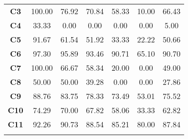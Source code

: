 \begin{appendices}
\begin{table}[h]
{\begin{tabular}{c|cccccc}
\rowcolor[HTML]{DAE8E5} 
{\color[HTML]{000000} \textbf{C3}} & {\color[HTML]{000000} 100.00} & {\color[HTML]{000000} 76.92} & {\color[HTML]{000000} 70.84} & {\color[HTML]{000000} 58.33} & {\color[HTML]{000000} 10.00} & {\color[HTML]{000000} 66.43} \\
\rowcolor[HTML]{EEF9FB} 
{\color[HTML]{000000} \textbf{C4}} & {\color[HTML]{000000} 33.33} & {\color[HTML]{000000} 0.00} & {\color[HTML]{000000} 0.00} & {\color[HTML]{000000} 0.00} & {\color[HTML]{000000} 0.00} & {\color[HTML]{000000} 5.00} \\
\rowcolor[HTML]{DAE8E5} 
{\color[HTML]{000000} \textbf{C5}} & {\color[HTML]{000000} 91.67} & {\color[HTML]{000000} 61.54} & {\color[HTML]{000000} 51.92} & {\color[HTML]{000000} 33.33} & {\color[HTML]{000000} 22.22} & {\color[HTML]{000000} 50.66} \\
\rowcolor[HTML]{EEF9FB} 
{\color[HTML]{000000} \textbf{C6}} & {\color[HTML]{000000} 97.30} & {\color[HTML]{000000} 95.89} & {\color[HTML]{000000} 93.46} & {\color[HTML]{000000} 90.71} & {\color[HTML]{000000} 65.10} & {\color[HTML]{000000} 90.70} \\
\rowcolor[HTML]{DAE8E5} 
{\color[HTML]{000000} \textbf{C7}} & {\color[HTML]{000000} 100.00} & {\color[HTML]{000000} 66.67} & {\color[HTML]{000000} 58.34} & {\color[HTML]{000000} 20.00} & {\color[HTML]{000000} 0.00} & {\color[HTML]{000000} 49.00} \\
\rowcolor[HTML]{EEF9FB} 
{\color[HTML]{000000} \textbf{C8}} & {\color[HTML]{000000} 50.00} & {\color[HTML]{000000} 50.00} & {\color[HTML]{000000} 39.28} & {\color[HTML]{000000} 0.00} & {\color[HTML]{000000} 0.00} & {\color[HTML]{000000} 27.86} \\
\rowcolor[HTML]{DAE8E5} 
{\color[HTML]{000000} \textbf{C9}} & {\color[HTML]{000000} 88.76} & {\color[HTML]{000000} 83.75} & {\color[HTML]{000000} 78.33} & {\color[HTML]{000000} 73.49} & {\color[HTML]{000000} 53.01} & {\color[HTML]{000000} 75.52} \\
\rowcolor[HTML]{EEF9FB} 
{\color[HTML]{000000} \textbf{C10}} & {\color[HTML]{000000} 74.29} & {\color[HTML]{000000} 70.00} & {\color[HTML]{000000} 67.82} & {\color[HTML]{000000} 58.06} & {\color[HTML]{000000} 33.33} & {\color[HTML]{000000} 62.82} \\
\rowcolor[HTML]{DAE8E5} 
{\color[HTML]{000000} \textbf{C11}} & {\color[HTML]{000000} 92.26} & {\color[HTML]{000000} 90.73} & {\color[HTML]{000000} 88.54} & {\color[HTML]{000000} 85.21} & {\color[HTML]{000000} 80.00} & {\color[HTML]{000000} 87.84} \\
\rowcolor[HTML]{EEF9FB} 

\end{tabular}}
\end{table}
\end{appendices}
